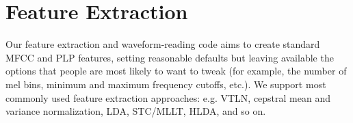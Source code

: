 \documentclass[10pt,conference,letterpaper]{IEEEtran}
\begin{document}


\section{Feature Extraction}
\label{sec:feats}
Our feature extraction and waveform-reading code aims to create standard MFCC 
and PLP features, setting reasonable defaults but leaving available the options 
that people are most likely to want to tweak (for example, the number of mel 
bins, minimum and maximum frequency cutoffs, etc.).  We support most commonly
used feature extraction approaches: e.g. VTLN, cepstral mean and variance normalization,
LDA, STC/MLLT, HLDA, and so on.





\end{document}
